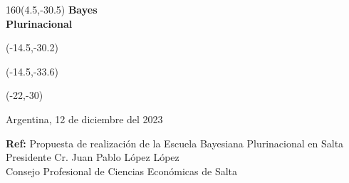 \documentclass[a4paper,10pt]{letter}
\begin{document}
\begin{letter}

\begin{textblock}{160}(4.5,-30.5)
\noindent \Huge\textbf{Bayes \\ Plurinacional \\}
\end{textblock}
\begin{textblock}{80}(-14.5,-30.2)
\LARGE  {}
\end{textblock}
\begin{textblock}{80}(-14.5,-33.6)
\LARGE {\scalebox{5}{$p$}}
\end{textblock}
\begin{textblock}{80}(-22,-30)
\LARGE {\scalebox{2.505}{$($}}
\end{textblock}




\vspace{-4.2cm}

\begin{flushright}
Argentina, 12 de diciembre del 2023  \\
\end{flushright}

\noindent

\hfill \textbf{Ref:} Propuesta de realización de la Escuela Bayesiana Plurinacional en Salta \\


\noindent Presidente Cr. Juan Pablo López López \\
\noindent Consejo Profesional de Ciencias Económicas de Salta\\ [0cm]


\end{letter}
\end{document}
